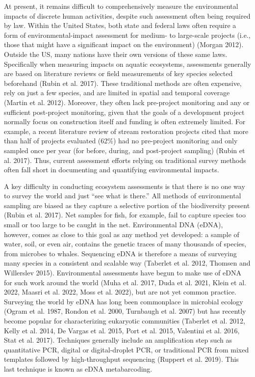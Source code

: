 \documentclass[
]{article}
\begin{document}
At present, it remains difficult to comprehensively measure the
environmental impacts of discrete human activities, despite such
assessment often being required by law. Within the United States, both
state and federal laws often require a form of environmental-impact
assessment for medium- to large-scale projects (i.e., those that might
have a significant impact on the environment) (Morgan 2012). Outside the
US, many nations have their own versions of these same laws.
Specifically when measuring impacts on aquatic ecosystems, assessments
generally are based on literature reviews or field measurements of key
species selected beforehand (Rubin et al. 2017). These traditional
methods are often expensive, rely on just a few species, and are limited
in spatial and temporal coverage (Martin et al. 2012). Moreover, they
often lack pre-project monitoring and any or sufficient post-project
monitoring, given that the goals of a development project normally focus
on construction itself and funding is often extremely limited. For
example, a recent literature review of stream restoration projects cited
that more than half of projects evaluated (62\%) had no pre-project
monitoring and only sampled once per year (for before, during, and
post-project sampling) (Rubin et al. 2017). Thus, current assessment
efforts relying on traditional survey methods often fall short in
documenting and quantifying environmental impacts.

A key difficulty in conducting ecosystem assessments is that there is no
one way to survey the world and just ``see what is there.'' All methods
of environmental sampling are biased as they capture a selective portion
of the biodiversity present (Rubin et al. 2017). Net samples for fish,
for example, fail to capture species too small or too large to be caught
in the net. Environmental DNA (eDNA), however, comes as close to this
goal as any method yet developed: a sample of water, soil, or even air,
contains the genetic traces of many thousands of species, from microbes
to whales. Sequencing eDNA is therefore a means of surveying many
species in a consistent and scalable way (Taberlet et al. 2012, Thomsen
and Willerslev 2015). Environmental assessments have begun to make use
of eDNA for such work around the world (Muha et al. 2017, Duda et al.
2021, Klein et al. 2022, Maasri et al. 2022, Moss et al. 2022), but are
not yet common practice. Surveying the world by eDNA has long been
commonplace in microbial ecology (Ogram et al. 1987, Rondon et al. 2000,
Turnbaugh et al. 2007) but has recently become popular for
characterizing eukaryotic communities (Taberlet et al. 2012, Kelly et
al. 2014, De Vargas et al. 2015, Port et al. 2015, Valentini et al.
2016, Stat et al. 2017). Techniques generally include an amplification
step such as quantitative PCR, digital or digital-droplet PCR, or
traditional PCR from mixed templates followed by high-throughput
sequencing (Ruppert et al. 2019). This last technique is known as eDNA
metabarcoding.
\end{document}
